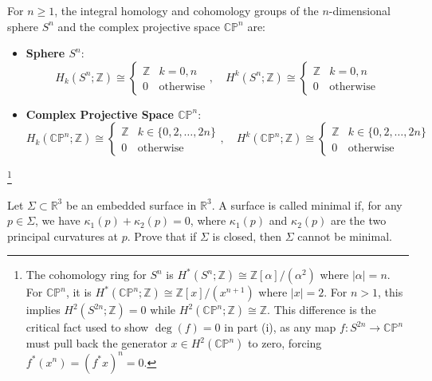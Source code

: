 \begin{solution}
\begin{remark}
For $n \ge 1$, the integral homology and cohomology groups of the $n$-dimensional sphere $S^n$ and the complex projective space $\mathbb{CP}^n$ are:
\begin{itemize}
    \item \textbf{Sphere $S^n$}:
    \begin{equation*}
        H_k(S^n; \mathbb{Z}) \cong \begin{cases} \mathbb{Z} & k=0, n \\ 0 & \text{otherwise} \end{cases}, \quad H^k(S^n; \mathbb{Z}) \cong \begin{cases} \mathbb{Z} & k=0, n \\ 0 & \text{otherwise} \end{cases}
    \end{equation*}
    \item \textbf{Complex Projective Space $\mathbb{CP}^n$}:
    \begin{equation*}
        H_k(\mathbb{CP}^n; \mathbb{Z}) \cong \begin{cases} \mathbb{Z} & k \in \{0, 2, \dots, 2n\} \\ 0 & \text{otherwise} \end{cases}, \quad H^k(\mathbb{CP}^n; \mathbb{Z}) \cong \begin{cases} \mathbb{Z} & k \in \{0, 2, \dots, 2n\} \\ 0 & \text{otherwise} \end{cases}
    \end{equation*}
\end{itemize}
\footnote{The cohomology ring for $S^n$ is $H^*(S^n; \mathbb{Z}) \cong \mathbb{Z}[\alpha]/(\alpha^2)$ where $|\alpha| = n$. For $\mathbb{CP}^n$, it is $H^*(\mathbb{CP}^n; \mathbb{Z}) \cong \mathbb{Z}[x]/(x^{n+1})$ where $|x| = 2$. For $n > 1$, this implies $H^2(S^{2n}; \mathbb{Z}) = 0$ while $H^2(\mathbb{CP}^n; \mathbb{Z}) \cong \mathbb{Z}$. This difference is the critical fact used to show $\deg(f)=0$ in part (i), as any map $f: S^{2n} \to \mathbb{CP}^n$ must pull back the generator $x \in H^2(\mathbb{CP}^n)$ to zero, forcing $f^*(x^n) = (f^*x)^n = 0$.}
\end{remark}
\end{solution}

\begin{exercise}
\label{geometry:2024:2}
Let $\Sigma \subset \mathbb{R}^3$ be an embedded surface in $\mathbb{R}^3$. A surface is called minimal if, for any $p \in \Sigma$, we have $\kappa_1(p) + \kappa_2(p) = 0$, where $\kappa_1(p)$ and $\kappa_2(p)$ are the two principal curvatures at $p$. Prove that if $\Sigma$ is closed, then $\Sigma$ cannot be minimal.
\end{exercise}

